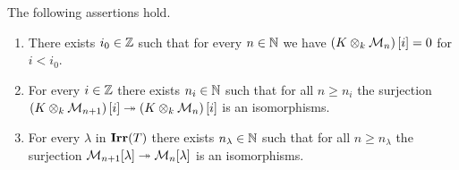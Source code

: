 \begin{lemma}\label{lemma:boundedness_of_gradation_and_two_stabilizations}
The following assertions hold.
\begin{enumerate}[label=\emph{\textbf{(\arabic*)}}, leftmargin=1.5em]
\item There exists $i_0\in {\mathbb Z}$ such that for every $n\in {\mathbb N}$ we have $\left(K\otimes_k{\mathcal M}_n\right)[i] = 0$ for $i< i_0$.
\item For every $i\in {\mathbb Z}$ there exists $n_i\in {\mathbb N}$ such that for all $n\geq n_i$ the surjection $\left(K\otimes_k{\mathcal M}_{n+1}\right)[i]\twoheadrightarrow \left(K\otimes_k{\mathcal M}_n\right)[i]$ is an isomorphisms.
\item For every $\lambda$ in $\mathbf{Irr}(T)$ there exists $n_{\lambda}\in {\mathbb N}$ such that for all $n\geq n_{\lambda}$ the surjection ${\mathcal M}_{n+1}[\lambda]\twoheadrightarrow {\mathcal M}_n[\lambda]$ is an isomorphisms.
\end{enumerate}
\end{lemma}
